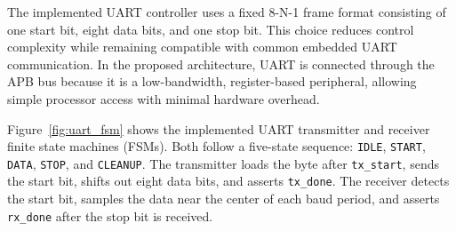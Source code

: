 \documentclass[runningheads]{llncs}
\begin{document}
The implemented UART controller uses a fixed 8-N-1 frame format consisting of one start bit, eight data bits, and one stop bit. This choice reduces control complexity while remaining compatible with common embedded UART communication. In the proposed architecture, UART is connected through the APB bus because it is a low-bandwidth, register-based peripheral, allowing simple processor access with minimal hardware overhead.

Figure~\ref{fig:uart_fsm} shows the implemented UART transmitter and receiver finite state machines (FSMs). Both follow a five-state sequence: \texttt{IDLE}, \texttt{START}, \texttt{DATA}, \texttt{STOP}, and \texttt{CLEANUP}. The transmitter loads the byte after \texttt{tx\_start}, sends the start bit, shifts out eight data bits, and asserts \texttt{tx\_done}. The receiver detects the start bit, samples the data near the center of each baud period, and asserts \texttt{rx\_done} after the stop bit is received.
\end{document}
